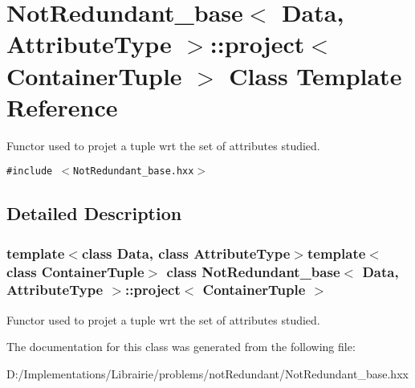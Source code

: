 \section{Not\-Redundant\_\-base$<$ Data, Attribute\-Type $>$::project$<$ Container\-Tuple $>$ Class Template Reference}
\label{class_not_redundant__base_1_1project}
Functor used to projet a tuple wrt the set of attributes studied.  


{\tt \#include $<$Not\-Redundant\_\-base.hxx$>$}



\subsection{Detailed Description}
\subsubsection*{template$<$class Data, class Attribute\-Type$>$template$<$class Container\-Tuple$>$ class Not\-Redundant\_\-base$<$ Data, Attribute\-Type $>$::project$<$ Container\-Tuple $>$}

Functor used to projet a tuple wrt the set of attributes studied. 



The documentation for this class was generated from the following file:\begin{CompactItemize}
\item 
D:/Implementations/Librairie/problems/not\-Redundant/Not\-Redundant\_\-base.hxx\end{CompactItemize}

